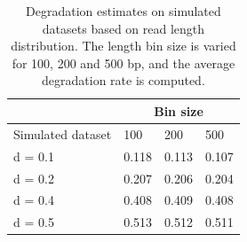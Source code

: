 \begin{table}[htbp]
  \centering
    \begin{tabular}{|p{3.5cm}|p{1.5cm}|p{1.5cm}|p{1.5cm}|}
\cline{2-4}    \multicolumn{1}{r|}{} & \multicolumn{3}{c|}{Bin size} \bigstrut\\
    \hline
    Simulated dataset & 100   & 200   & 500 \bigstrut\\
    \hline
    d = 0.1 & 0.118 & 0.113 & 0.107 \bigstrut\\
    \hline
    d = 0.2 & 0.207 & 0.206 & 0.204 \bigstrut\\
    \hline
    d = 0.4 & 0.408 & 0.409 & 0.408 \bigstrut\\
    \hline
    d = 0.5 & 0.513 & 0.512 & 0.511 \bigstrut\\
    \hline
    \end{tabular}%
  \caption[Degradation estimates on simulated datasets based on read length distribution]{Degradation estimates on simulated datasets based on read length distribution. The length bin size is varied for 100, 200 and 500 bp, and the average degradation rate is computed.}
  \label{tab:addlabel}%
\end{table}%

